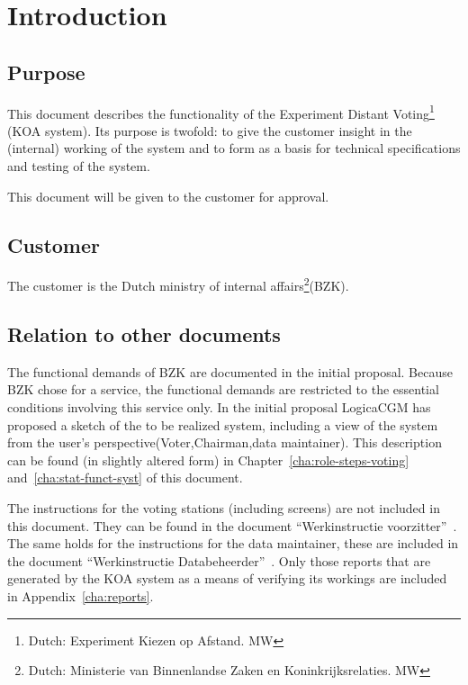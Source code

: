 \chapter{Introduction}\label{cha:introduction}

\section{Purpose}\label{sec1:perpose}

This document describes the functionality of the Experiment Distant
Voting\footnote{Dutch: Experiment Kiezen op Afstand. MW} (KOA
system). Its purpose is twofold: to give the customer insight in the
(internal) working of the system and to form as a basis for technical
specifications and testing of the system.

This document will be given to the customer for approval.

\section{Customer}\label{sec1:customer}

The customer is the Dutch ministry of internal affairs\footnote{Dutch:
Ministerie van Binnenlandse Zaken en Koninkrijksrelaties. MW}(BZK).

\section{Relation to other documents}\label{sec1:relat-other-docum}

The functional demands of BZK are documented in the initial
proposal. Because BZK chose for a service, the functional demands are
restricted to the essential conditions involving this service only. In
the initial proposal LogicaCGM has proposed a sketch of the to be
realized system, including a view of the system from the user's
perspective(Voter,Chairman,data maintainer). This description can be
found (in slightly altered form) in
Chapter~\ref{cha:role-steps-voting} and~\ref{cha:stat-funct-syst} of
this document.

The instructions for the voting stations (including screens) are not
included in this document. They can be found in the document
``Werkinstructie voorzitter''~\cite{Voorzitter}. The same holds for
the instructions for the data maintainer, these are included in the
document ``Werkinstructie Databeheerder''~\cite{Databeheerder}. Only
those reports that are generated by the KOA system as a means of
verifying its workings are included in Appendix~\ref{cha:reports}.

